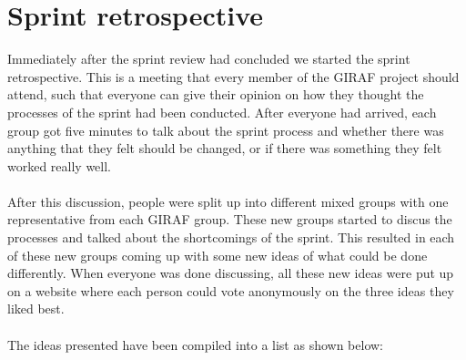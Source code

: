 \section{Sprint retrospective}
Immediately after the sprint review had concluded we started the sprint retrospective.
This is a meeting that every member of the GIRAF project should attend, such that everyone can give their opinion on how they thought the processes of the sprint had been conducted.
After everyone had arrived, each group got five minutes to talk about the sprint process and whether there was anything that they felt should be changed, or if there was something they felt worked really well.
\\\\
After this discussion, people were split up into different mixed groups with one representative from each GIRAF group.
These new groups started to discus the processes and talked about the shortcomings of the sprint.
This resulted in each of these new groups coming up with some new ideas of what could be done differently.
When everyone was done discussing, all these new ideas were put up on a website where each person could vote anonymously on the three ideas they liked best.
\\\\
The ideas presented have been compiled into a list as shown below:

